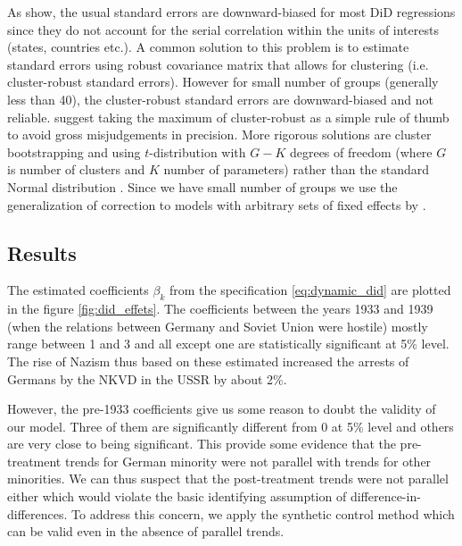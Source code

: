 As \citet{bertrand_how_2004} show, the usual standard errors  are downward-biased for most DiD regressions since they do not account for the serial correlation within the units of interests (states, countries etc.). A common solution to this problem is to estimate standard errors using robust covariance matrix that allows for clustering (i.e. cluster-robust standard errors). However for small number of groups (generally less than 40), the cluster-robust standard errors are downward-biased and not reliable. \citet[chapter 8]{angrist_mostly_2009} suggest taking the maximum of cluster-robust as a simple rule of thumb to avoid gross misjudgements in precision. More rigorous solutions are cluster bootstrapping \citep{cameron_bootstrap-based_2008, cameron_practitioners_2015} and  using $t$-distribution with $G- K$ degrees of freedom (where $G$ is number of clusters and $K$ number of parameters) rather than the standard Normal distribution \citep{mccaffrey_bias_2002, imbens_robust_2016}.
Since we have small number of groups we use the generalization of \citet{mccaffrey_bias_2002} correction to models with arbitrary sets of fixed effects by \citet{pustejovsky_small-sample_2018}.

\subsection{Results}
The estimated coefficients  $\beta_k$ from the specification \ref{eq:dynamic_did} are plotted in the figure \ref{fig:did_effets}. The coefficients between the years 1933 and 1939 (when the relations between Germany and Soviet Union were hostile) mostly range  between 1 and 3 and all except one are statistically significant at 5\% level. The rise of Nazism thus based on these estimated increased the arrests of Germans by the NKVD in the USSR by about 2\%.  

However, the pre-1933 coefficients give us some reason to doubt the
validity of our model. Three of them are significantly different from 0 at 5\% level and others are very close to being significant. 
This provide some evidence that the pre-treatment trends for German minority were not parallel with trends for other minorities. We can thus suspect that the post-treatment trends were not parallel either which
would violate the basic identifying assumption of
difference-in-differences. To address this concern, we apply the synthetic control method which can be valid even in the absence of  parallel trends. 

